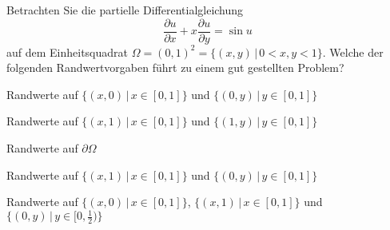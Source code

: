 Betrachten Sie die partielle Differentialgleichung
\[
\frac{\partial u}{\partial x}
+x
\frac{\partial u}{\partial y}
=
\sin u
\]
auf dem Einheitsquadrat $\Omega=(0,1)^2=\{(x,y)\,|\, 0<x,y<1\}$.
Welche der folgenden Randwertvorgaben führt zu einem gut gestellten
Problem?
\begin{teilaufgaben}
\item
Randwerte auf $\{(x,0)\,|\,x\in [0,1]\}$ und $\{(0,y)\,|\,y\in[0,1]\}$
\item
Randwerte auf $\{(x,1)\,|\,x\in [0,1]\}$ und $\{(1,y)\,|\,y\in[0,1]\}$
\item
Randwerte auf $\partial\Omega$
\item
Randwerte auf $\{(x,1)\,|\,x\in [0,1]\}$ und $\{(0,y)\,|\,y\in[0,1]\}$
\item
Randwerte auf
$\{(x,0)\,|\,x\in [0,1]\}$,
$\{(x,1)\,|\,x\in [0,1]\}$ und 
$\{(0,y)\,|\,y\in[0,\frac12)\}$
\end{teilaufgaben}

